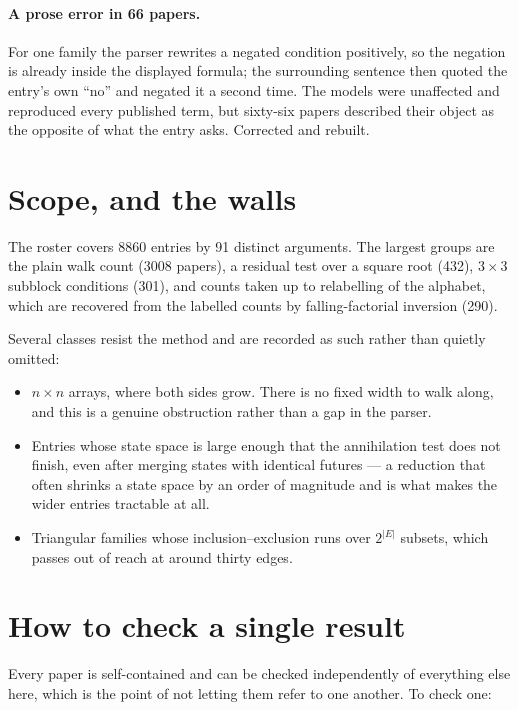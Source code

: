 \documentclass[11pt,a4paper]{article}
\theoremstyle{plain}
\theoremstyle{definition}
\begin{document}
\paragraph{A prose error in 66 papers.}
For one family the parser rewrites a negated condition positively, so the negation is already
inside the displayed formula; the surrounding sentence then quoted the entry's own ``no'' and
negated it a second time. The models were unaffected and reproduced every published term, but
sixty-six papers described their object as the opposite of what the entry asks. Corrected and
rebuilt.

\section{Scope, and the walls}

The roster covers 8860 entries by 91 distinct arguments. The largest groups are the plain walk
count (3008 papers), a residual test over a square root (432), $3\times3$ subblock conditions
(301), and counts taken up to relabelling of the alphabet, which are recovered from the labelled
counts by falling-factorial inversion (290).

Several classes resist the method and are recorded as such rather than quietly omitted:

\begin{itemize}
\item $n\times n$ arrays, where both sides grow. There is no fixed width to walk along, and
this is a genuine obstruction rather than a gap in the parser.
\item Entries whose state space is large enough that the annihilation test does not finish, even
after merging states with identical futures --- a reduction that often shrinks a state space by
an order of magnitude and is what makes the wider entries tractable at all.
\item Triangular families whose inclusion--exclusion runs over $2^{|E|}$ subsets, which passes
out of reach at around thirty edges.
\end{itemize}

\section{How to check a single result}

Every paper is self-contained and can be checked independently of everything else here, which
is the point of not letting them refer to one another. To check one:
\end{document}
